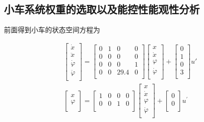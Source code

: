 \documentclass{MathorCupmodeling}
\begin{document}
\subsection{小车系统权重的选取以及能控性能观性分析}

前面得到小车的状态空间方程为

\begin{equation}
\begin{aligned}
&\begin{bmatrix}
\dot x\\
\ddot x\\
\dot{\varphi}\\
\ddot{\varphi}\\
\end{bmatrix}
=
\begin{bmatrix}
0 & 1 & 0 & 0\\
0 & 0 & 0 & 0\\
0 & 0 & 0 & 1\\
0 & 0 & 29.4 & 0\\
\end{bmatrix}
\begin{bmatrix}
x\\
\dot x\\
\varphi\\
\dot{\varphi}\\
\end{bmatrix}
+
\begin{bmatrix}
0\\
1\\
0\\
3\\
\end{bmatrix}
u'\\
&\begin{bmatrix}
x\\
\varphi\\
\end{bmatrix}
=
\begin{bmatrix}
1 &0 &0 &0\\
0 &0 &1 &0\\
\end{bmatrix}
\begin{bmatrix}
x\\
\dot x\\
\varphi\\
\dot{\varphi}\\
\end{bmatrix}
+
\begin{bmatrix}
0\\
0\\
\end{bmatrix}
u^{'}\\
\end{aligned}
\end{equation}
\end{document}
